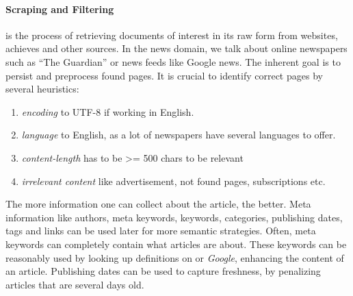   \paragraph{Scraping and Filtering} is the process of retrieving documents of interest in its raw form from websites, achieves and other sources. In the news domain, we talk about online newspapers such as ``The Guardian'' or news feeds like Google news. The inherent goal is to persist and preprocess found pages. It is crucial to identify correct pages by several heuristics:

  \begin{enumerate}
    \item \emph{encoding} to UTF-8 if working in English.
    \item \emph{language} to English, as a lot of newspapers have several languages to offer.
    \item \emph{content-length} has to be >= 500 chars to be relevant
    \item \emph{irrelevant content} like advertisement, not found pages, subscriptions etc.
  \end{enumerate}

  The more information one can collect about the article, the better. Meta information like authors, meta keywords, keywords, categories, publishing dates, tags and links can be used later for more semantic strategies. Often, meta keywords can completely contain what articles are about. These keywords can be reasonably used by looking up definitions on \wiki{} or \emph{Google}, enhancing the content of an article. Publishing dates can be used to capture freshness, by penalizing articles that are several days old.

